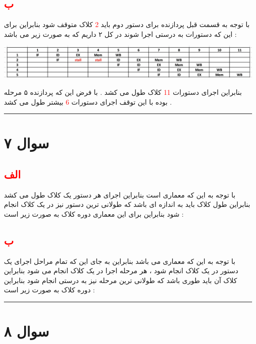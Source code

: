 \documentclass{article}
\begin{document}
\subsection*{\textcolor{red}{ب}}
با توجه به قسمت قبل پردازنده برای دستور دوم باید 
\textcolor{red}{2}
کلاک متوقف شود بنابراین برای این که دستورات به درستی اجرا شوند در کل ۲ 
داریم که به صورت زیر می باشد  : 
\begin{center}
	\includegraphics[width=1\textwidth]{q6p1}
\end{center}
بنابراین اجرای دستورات 
\textcolor{red}{11}
کلاک طول می کشد . با فرض این که پردازنده ۵ مرحله بوده با این توقف اجرای دستورات 
\textcolor{red}{6}
بیشتر طول می کشد . 
\hrule
\section*{سوال ۷}
\subsection*{\textcolor{red}{الف}}
با توجه به این که معماری 
است بنابراین اجرای هر دستور یک کلاک طول می کشد بنابراین طول کلاک باید به اندازه ای باشد که طولانی ترین دستور نیز در یک کلاک انجام شود بنابراین برای این معماری دوره کلاک به صورت زیر است  :‌
\begin{center}
\end{center}
\subsection*{\textcolor{red}{ب}}
با توجه به این که معماری 
می باشد بنابراین به جای این که تمام مراحل اجرای یک دستور در یک کلاک انجام شود ، هر مرحله اجرا در یک کلاک انجام می شود بنابراین کلاک آن باید طوری باشد که طولانی ترین مرحله نیز به درستی انجام شود بنابراین دوره کلاک به صورت زیر است  : 
\begin{center}
\end{center}
\hrule
\section*{سوال ۸}
\end{document}
